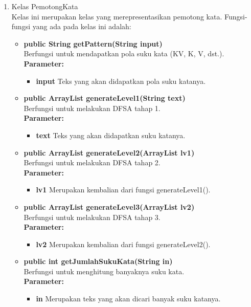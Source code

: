 \begin{enumerate}
	\item Kelas PemotongKata\\
	Kelas ini merupakan kelas yang merepresentasikan pemotong kata. Fungsi-fungsi yang ada pada kelas ini adalah:
	\begin{itemize}
		\item \textbf{public String getPattern(String input)} \\
		Berfungsi untuk mendapatkan pola suku kata (KV, K, V, dst.).\\
		\textbf{Parameter:}
		\begin{itemize}
			\item \textbf{input} Teks yang akan didapatkan pola suku katanya.
		\end{itemize}
		
		\item \textbf{public ArrayList generateLevel1(String text)} \\
		Berfungsi untuk melakukan DFSA tahap 1.\\
		\textbf{Parameter:}
		\begin{itemize}
			\item \textbf{text} Teks yang akan didapatkan suku katanya.
		\end{itemize}
		
		\item \textbf{public ArrayList generateLevel2(ArrayList lv1)}\\
		Berfungsi untuk melakukan DFSA tahap 2.\\
		\textbf{Parameter:}
		\begin{itemize}
			\item \textbf{lv1} Merupakan kembalian dari fungsi generateLevel1().
		\end{itemize}
		
		\item \textbf{public ArrayList generateLevel3(ArrayList lv2)}\\
		Berfungsi untuk melakukan DFSA tahap 3.\\
		\textbf{Parameter:}
		\begin{itemize}
			\item \textbf{lv2} Merupakan kembalian dari fungsi generateLevel2().
		\end{itemize}
		
		\item \textbf{public int getJumlahSukuKata(String in)}\\
		Berfungsi untuk menghitung banyaknya suku kata.\\
		\textbf{Parameter:}
		\begin{itemize}
			\item \textbf{in} Merupakan teks yang akan dicari banyak suku katanya.
		\end{itemize}
	\end{itemize}
	

\end{enumerate}
